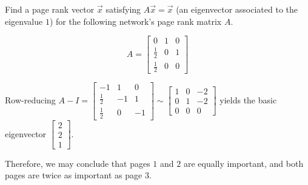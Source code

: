 \begin{applicationActivities}{5}{29}
\begin{activity}{10}
Find a page rank vector \(\vec{x}\) satisfying \(A\vec{x}=\vec{x}\)
(an eigenvector associated to the eigenvalue \(1\))
for the following network's page rank matrix \(A\).

\begin{multicols}{2}
\begin{center}
\end{center}

\[
  A
    =
  \begin{bmatrix}
    0 & 1 & 0 \\
    \frac{1}{2} & 0 & 1 \\
    \frac{1}{2} & 0 & 0
  \end{bmatrix}
\]
\end{multicols}
\end{activity}

\begin{observation}
Row-reducing
\(
  A-I
    =
  \begin{bmatrix}
    -1 & 1 & 0 \\
    \frac{1}{2} & -1 & 1 \\
    \frac{1}{2} & 0 & -1
  \end{bmatrix}
    \sim
  \begin{bmatrix}
    1 & 0 & -2 \\
    0 & 1 & -2 \\
    0 & 0 & 0
  \end{bmatrix}
\)
yields the basic eigenvector \(\begin{bmatrix} 2 \\ 2 \\1 \end{bmatrix}\).

Therefore, we may conclude that pages \(1\) and \(2\) are equally important,
and both pages are twice as important as page \(3\).
\begin{center}
\end{center}
\end{observation}
\end{applicationActivities}
